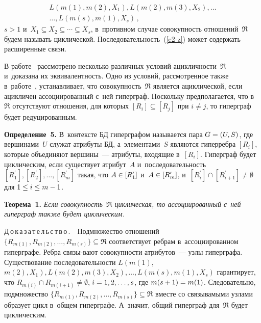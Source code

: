 \begin{multicols}{2}
\vspace*{-4pt}

\noindent
\begin{multline}
L\left(m(1), m(2), X_1\right), L\left(m(2), m(3), X_2\right),\ldots\\
\ldots , L\left(m(s), m(1),
X_s\right)\,,
\label{e2-z}
\end{multline}
$s>1$ и~$X_1\subseteq X_2\subseteq \cdots \subseteq X_s$, в~противном случае
совокупность отношений~$\mathfrak{R}$ будем называть циклической.
Последовательность~(\ref{e2-z}) может содержать расширенные связи.

  В работе~\cite{9-z} рассмотрено несколько различных условий
ацикличности~$\mathfrak{R}$ и~доказана их эквивалентность. Одно из
условий, рассмотренное также в~работе~\cite{3-z}, устанавливает, что
совокупность~$\mathfrak{R}$ является ациклической, если ацикличен
ас\-со\-ци\-иро\-ван\-ный с~ней гиперграф. Поскольку предполагается, что
в~$\mathfrak{R}$ отсутствуют отношения, для которых $[R_i]\subseteq [R_j]$
при $i\not= j$, то гиперграф будет редуцированным.

\vspace*{2pt}

  \noindent
  \textbf{Определение~5.} В~контексте БД гиперграфом называется
пара $G\hm= (U,S)$, где вершинами~$U$ служат атрибуты БД,
а~элементами~$S$ являются гиперребра $[R_i]$, которые объединяют
вершины~--- атрибуты, входящие в~$[R_i]$. Гиперграф будет циклическим,
если существует атрибут~$A$ и~последовательность $[R_1^\prime],
[R_2^\prime],\ldots , [R_m^\prime]$ такая, что $A\hm\in [R_1^\prime]$
и~$A\hm\in [R_m^\prime]$, и~$[R_i^\prime]\cap [R^\prime_{i+1}]\not= \emptyset$
для $1\hm\leq i\hm\leq m\hm-1$.

\vspace*{2pt}

  \noindent
  \textbf{Теорема~1.} \textit{Если совокупность~$\mathfrak{R}$ циклическая,
то ассоциированный с~ней гиперграф также будет цик\-лическим.}

\vspace*{2pt}

  \noindent
  Д\,о\,к\,а\,з\,а\,т\,е\,л\,ь\,с\,т\,в\,о\,.\ \ Подмножество отношений\linebreak
   $\{R_{m(1)}, R_{m(2)}, \ldots, R_{m(s)}\}\subseteq \mathfrak{R}$ соответствует 
реб\-рам в~ассоциированном гиперграфе. Ребра свя\-зы-\linebreak вают совокупности атрибутов~---
узлы гиперграфа. Существование последовательности $L\left(m(1)\right.$,
$\left.m(2),X_1\right)\!, 
L\left(m(2), m(3),X_2\right)\!, \ldots , L\left( m(s), m(1)\!,X_s\right)$
гарантирует, что $R_{m(i)}\cap R_{m(i+1)}\not=\emptyset$, $i\hm= 1,2,\ldots , s$,
где $m(s+1)\hm= m(1)$. Следовательно, подмножество $\{ R_{m(1)}, R_{m(2)},
\ldots , R_{m(s)}\}\subseteq \mathfrak{R}$ вмес\-те со связыва\-мыми узлами
образует цикл в~общем гиперграфе. А~значит, общий гиперграф
для~$\mathfrak{R}$ будет циклическим.


\end{multicols}
